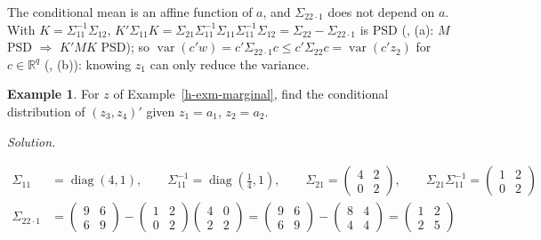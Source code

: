 \documentclass[12pt]{article}
\newcommand{\R}{\mathbb R}
\DeclareMathOperator{\diag}{diag}
\DeclareMathOperator\var{var}
\theoremstyle{definition}
\newtheorem{example}[theorem]{Example}
\newcommand{\boardtop}{\vspace*{-\abovedisplayskip}}
\begin{document}
The conditional mean is an affine function of \(a\), and \(\Sigma_{22\cdot1}\) does not depend on \(a\). With
\(K=\Sigma_{11}^{-1}\Sigma_{12}\), \(K'\Sigma_{11}K=\Sigma_{21}\Sigma_{11}^{-1}\Sigma_{11}\Sigma_{11}^{-1}\Sigma_{12}
=\Sigma_{22}-\Sigma_{22\cdot1}\) is PSD (, (a): \(M\) PSD \(\Rightarrow\) \(K'MK\) PSD); so
\(\var(c'w)=c'\Sigma_{22\cdot1}c\leqslant c'\Sigma_{22}c=\var(c'z_2)\) for \(c\in\R^q\) (, (b)):
knowing \(z_1\) can only reduce the variance.

\begin{example}\label{h-exm-conditional}
For \(z\) of Example~\ref{h-exm-marginal}, find the conditional distribution of \((z_3,z_4)'\) given \(z_1=a_1\),
\(z_2=a_2\).
\end{example}
\textit{Solution.}
\begin{board}[Theorem~\ref{h-thm-conditional} with \((z_1,z_2)'\), \((z_3,z_4)'\) as its \(z_1\), \(z_2\), \(p=q=2\); the blocks of \(\Sigma\) (Example~\ref{h-exm-marginal}); \(x'\Sigma_{11}x=4x_1^2+x_2^2>0\)
for \(x\ne0\): \(\Sigma_{11}\) is PD:]
\boardtop
\begin{align*}
\Sigma_{11}&=\diag(4,1),\qquad\Sigma_{11}^{-1}=\diag(\tfrac14,1),\qquad
\Sigma_{21}=\begin{pmatrix}4&2\\0&2\end{pmatrix},\qquad\Sigma_{21}\Sigma_{11}^{-1}=\begin{pmatrix}1&2\\0&2\end{pmatrix}\\
\Sigma_{22\cdot1}&=\begin{pmatrix}9&6\\6&9\end{pmatrix}-\begin{pmatrix}1&2\\0&2\end{pmatrix}\begin{pmatrix}4&0\\2&2\end{pmatrix}
=\begin{pmatrix}9&6\\6&9\end{pmatrix}-\begin{pmatrix}8&4\\4&4\end{pmatrix}=\begin{pmatrix}1&2\\2&5\end{pmatrix}
\end{align*}
\end{board}
\end{document}
